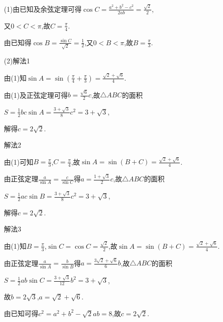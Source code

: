 \documentclass[12pt,UTF-8,a4paper]{ctexart}
\numberwithin{figure}{section}
\theoremstyle{mystyle}
\theoremstyle{mystylekaishu}
\theoremstyle{mystyle}
\numberwithin{xiti}{section}
\begin{document}
\begin{solutions}
(1)由已知及余弦定理可得$\cos C=\frac{a^{2}+b^{2}-c^{2}}{2ab}=\frac{\sqrt{2}}{2}$,

又$0<C<\pi$,故$C=\frac{\pi}{4}$.

由已知得$\cos B=\frac{\sin C}{\sqrt{2}}=\frac{1}{2}$,又$0<B<\pi$,故$B=\frac{\pi}{3}$.

(2)解法1

由(1)知$\sin A=\sin\left(\frac{\pi}{4}+\frac{\pi}{3}\right)=\frac{\sqrt{2}+\sqrt{6}}{4}$.

由(1)及正弦定理可得$b=\frac{\sqrt{6}}{2}c$,故$\triangle ABC$的面积

$S=\frac{1}{2}bc\sin A=\frac{3+\sqrt{3}}{8}c^{2}=3+\sqrt{3}$,

解得$c=2\sqrt{2}$.

解法2

由(1)可知$B=\frac{\pi}{3}$,$C=\frac{\pi}{4}$,故$\sin A=\sin(B+C)=\frac{\sqrt{2}+\sqrt{6}}{4}$.

由正弦定理$\frac{a}{\sin A}=\frac{c}{\sin C}$得$a=\frac{1+\sqrt{3}}{2}c$,故$\triangle ABC$的面积

$S=\frac{1}{2}ac\sin B=\frac{3+\sqrt{3}}{8}c^{2}=3+\sqrt{3}$,

解得$c=2\sqrt{2}$.

解法3

由(1)知$B=\frac{\pi}{3}$,$\sin C=\cos C=\frac{\sqrt{2}}{2}$,故$\sin A=\sin(B+C)=\frac{\sqrt{2}+\sqrt{6}}{4}$.

由正弦定理$\frac{a}{\sin A}=\frac{b}{\sin B}$得$a=\frac{3\sqrt{2}+\sqrt{6}}{6}b$,故$\triangle ABC$的面积

$S=\frac{1}{2}ab\sin C=\frac{3+\sqrt{3}}{12}b^{2}=3+\sqrt{3}$,

故$b=2\sqrt{3}$,$a=\sqrt{2}+\sqrt{6}$.

由已知可得$c^{2}=a^{2}+b^{2}-\sqrt{2}ab=8$,故$c=2\sqrt{2}$.
\end{solutions}

\end{document}

